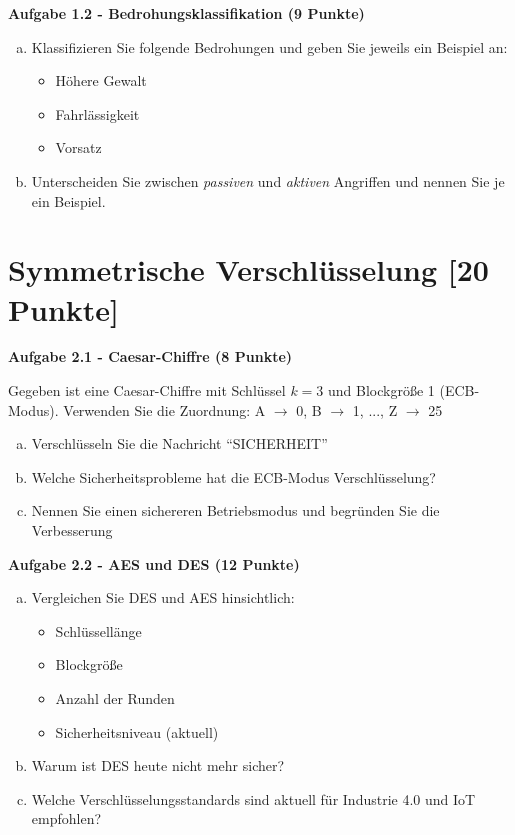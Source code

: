 \documentclass[12pt,a4paper]{article}
\begin{document}
\textbf{Aufgabe 1.2 - Bedrohungsklassifikation (9 Punkte)}

\begin{enumerate}[(a)]
    \item Klassifizieren Sie folgende Bedrohungen und geben Sie jeweils ein Beispiel an:
    \begin{itemize}
        \item Höhere Gewalt
        \item Fahrlässigkeit
        \item Vorsatz
    \end{itemize}
    
    \item Unterscheiden Sie zwischen \textit{passiven} und \textit{aktiven} Angriffen und nennen Sie je ein Beispiel.
\end{enumerate}

\vspace{5cm}


\newpage

\section{Symmetrische Verschlüsselung [20 Punkte]}

\textbf{Aufgabe 2.1 - Caesar-Chiffre (8 Punkte)}

Gegeben ist eine Caesar-Chiffre mit Schlüssel $k = 3$ und Blockgröße 1 (ECB-Modus).
Verwenden Sie die Zuordnung: A $\to$ 0, B $\to$ 1, ..., Z $\to$ 25

\begin{enumerate}[(a)]
    \item Verschlüsseln Sie die Nachricht ``SICHERHEIT''
    \item Welche Sicherheitsprobleme hat die ECB-Modus Verschlüsselung?
    \item Nennen Sie einen sichereren Betriebsmodus und begründen Sie die Verbesserung
\end{enumerate}

\vspace{4cm}

\textbf{Aufgabe 2.2 - AES und DES (12 Punkte)}

\begin{enumerate}[(a)]
    \item Vergleichen Sie DES und AES hinsichtlich:
    \begin{itemize}
        \item Schlüssellänge
        \item Blockgröße
        \item Anzahl der Runden
        \item Sicherheitsniveau (aktuell)
    \end{itemize}
    
    \item Warum ist DES heute nicht mehr sicher?
    
    \item Welche Verschlüsselungsstandards sind aktuell für Industrie 4.0 und IoT empfohlen?
\end{enumerate}
\end{document}
